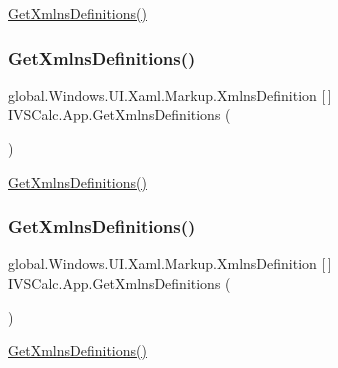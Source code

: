 \hyperlink{class_i_v_s_calc_1_1_app_a8f8ce062718726306de29d798b53bdba}{Get\+Xmlns\+Definitions()} 

\mbox{\label{class_i_v_s_calc_1_1_app_a8f8ce062718726306de29d798b53bdba}} 
\subsubsection{\texorpdfstring{Get\+Xmlns\+Definitions()}{GetXmlnsDefinitions()}\hspace{0.1cm}{\footnotesize\ttfamily [2/5]}}
{\footnotesize\ttfamily global.\+Windows.\+U\+I.\+Xaml.\+Markup.\+Xmlns\+Definition \mbox{[}$\,$\mbox{]} I\+V\+S\+Calc.\+App.\+Get\+Xmlns\+Definitions (\begin{DoxyParamCaption}{ }\end{DoxyParamCaption})}



\hyperlink{class_i_v_s_calc_1_1_app_a8f8ce062718726306de29d798b53bdba}{Get\+Xmlns\+Definitions()} 

\mbox{\label{class_i_v_s_calc_1_1_app_a8f8ce062718726306de29d798b53bdba}} 
\subsubsection{\texorpdfstring{Get\+Xmlns\+Definitions()}{GetXmlnsDefinitions()}\hspace{0.1cm}{\footnotesize\ttfamily [3/5]}}
{\footnotesize\ttfamily global.\+Windows.\+U\+I.\+Xaml.\+Markup.\+Xmlns\+Definition \mbox{[}$\,$\mbox{]} I\+V\+S\+Calc.\+App.\+Get\+Xmlns\+Definitions (\begin{DoxyParamCaption}{ }\end{DoxyParamCaption})}



\hyperlink{class_i_v_s_calc_1_1_app_a8f8ce062718726306de29d798b53bdba}{Get\+Xmlns\+Definitions()} 

\mbox{\label{class_i_v_s_calc_1_1_app_a8f8ce062718726306de29d798b53bdba}} 
